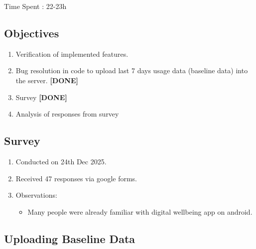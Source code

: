 \documentclass{article}
\begin{document}
Time Spent : 22-23h
\subsection{Objectives}
\begin{enumerate}
    \item Verification of implemented features.
    \item Bug resolution in code to upload last 7 days usage data (baseline data) into the server. \hfill \textbf{[DONE]}
    \item Survey \hfill \textbf{[DONE]}
    \item Analysis of responses from survey 
\end{enumerate}

\subsection{Survey}
\begin{enumerate}
    \item Conducted on 24th Dec 2025.
    \item Received 47 responses via google forms.
    \item Observations: 
    \begin{itemize}
        \item Many people were already familiar with digital wellbeing app on android.
    \end{itemize}
\end{enumerate}

\subsection{Uploading Baseline Data}
\end{document}
